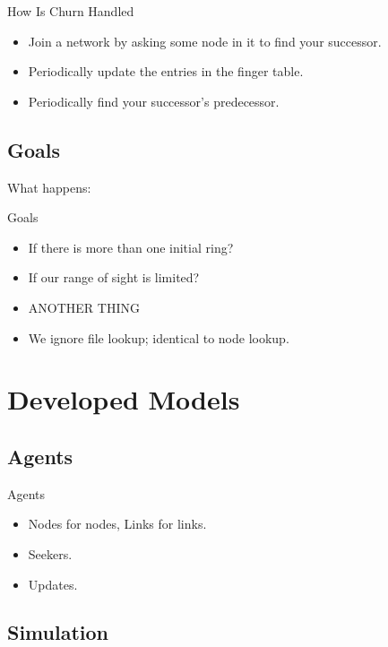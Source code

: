 \documentclass{beamer}
\begin{document}
\begin{frame}{How Is Churn Handled}
	\begin{itemize}
		\item Join a network by asking some node in it to find your successor.
		\item Periodically update the entries in the finger table.
		\item Periodically find your successor's predecessor.
	\end{itemize}

\end{frame}

\subsection{Goals}
What happens:
\begin{frame}{Goals}
	\begin{itemize}
		\item If there is more than one initial ring?
		\item If our range of sight is limited?
		\item ANOTHER THING
		\item We ignore file lookup; identical to node lookup.
	\end{itemize}

\end{frame}



\section{Developed Models} 


\subsection{Agents}
\begin{frame}{Agents}
	\begin{itemize}
		\item Nodes for nodes, Links for links.
		\item Seekers.
		\item Updates.
	\end{itemize}
\end{frame}


\subsection{Simulation}
\end{document}
